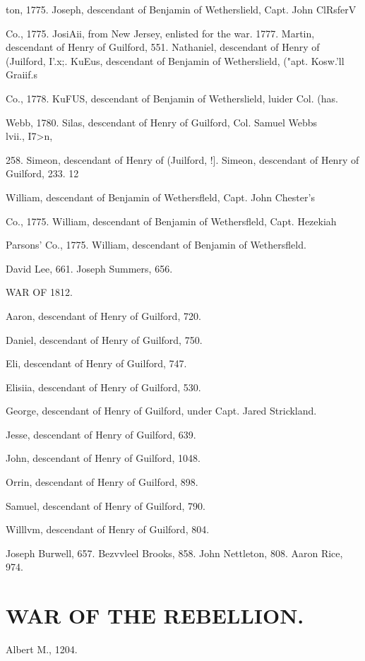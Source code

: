 \documentclass{book}
\begin{document}
ton, 1775. 
Joseph, descendant of Benjamin of Wetherslield, Capt. John ClRsferV 

Co., 1775. 
JosiAii, from New Jersey, enlisted for the war. 1777. 
Martin, descendant of Henry of Guilford, 551. 
Nathaniel, descendant of Henry of (Juilford, I'.x;. 
KuEus, descendant of Benjamin of Wetherslield, ("apt. Kosw.'ll Graiif.s 

Co., 1778. 
KuFUS, descendant of Benjamin of Wetherslield, luider Col. (has. 

Webb, 1780. 
Silas, descendant of Henry of Guilford, Col. Samuel Webbs \\lvii., I7>n, 

258. 
Simeon, descendant of Henry of (Juilford, !]. 
Simeon, descendant of Henry of Guilford, 233. 
12 




William, descendant of Benjamin of Wethersfleld, Capt. John Chester's 

Co., 1775. 
William, descendant of Benjamin of Wethersfleld, Capt. Hezekiah 

Parsons' Co., 1775. 
William, descendant of Benjamin of Wethersfleld. 

David Lee, 661. 
Joseph Summers, 656. 

WAR OF 1812. 

Aaron, descendant of Henry of Guilford, 720. 

Daniel, descendant of Henry of Guilford, 750. 

Eli, descendant of Henry of Guilford, 747. 

Elisiia, descendant of Henry of Guilford, 530. 

George, descendant of Henry of Guilford, under Capt. Jared Strickland. 

Jesse, descendant of Henry of Guilford, 639. 

John, descendant of Henry of Guilford, 1048. 

Orrin, descendant of Henry of Guilford, 898. 

Samuel, descendant of Henry of Guilford, 790. 

Willlvm, descendant of Henry of Guilford, 804. 

Joseph Burwell, 657. 
Bezvvleel Brooks, 858. 
John Nettleton, 808. 
Aaron Rice, 974. 

\chapter{WAR OF THE REBELLION.}
Albert M., 1204. 
\end{document}
